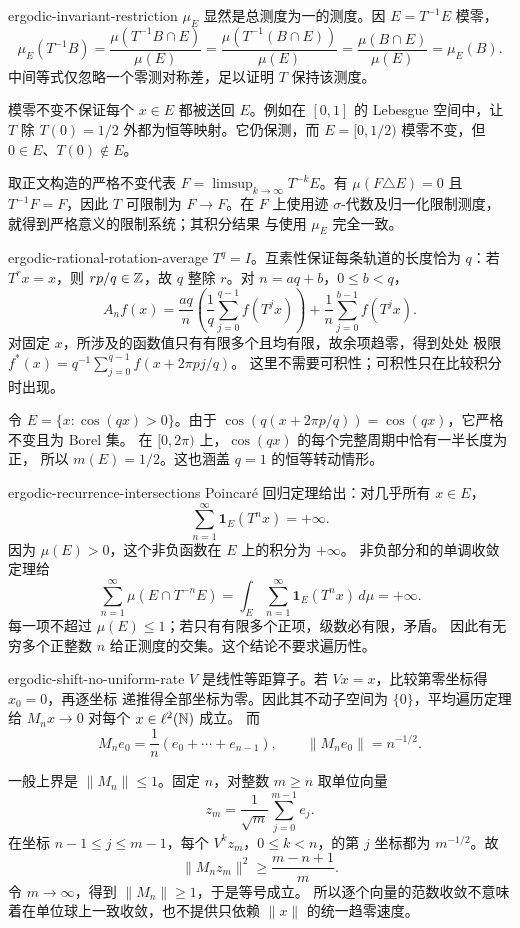 \begin{solution}{ergodic-invariant-restriction}
$\mu_E$ 显然是总测度为一的测度。因 $E=T^{-1}E$ 模零，
\[
 \mu_E(T^{-1}B)
 =\frac{\mu(T^{-1}B\cap E)}{\mu(E)}
 =\frac{\mu(T^{-1}(B\cap E))}{\mu(E)}
 =\frac{\mu(B\cap E)}{\mu(E)}=\mu_E(B).
\]
中间等式仅忽略一个零测对称差，足以证明 $T$ 保持该测度。

模零不变不保证每个 $x\in E$ 都被送回 $E$。例如在 $[0,1]$ 的 Lebesgue
空间中，让 $T$ 除 $T(0)=1/2$ 外都为恒等映射。它仍保测，而
$E=[0,1/2)$ 模零不变，但 $0\in E$、$T(0)\notin E$。

取正文构造的严格不变代表
$F=\limsup_{k\to\infty}T^{-k}E$。有 $\mu(F\triangle E)=0$ 且
$T^{-1}F=F$，因此 $T$ 可限制为 $F\to F$。在 $F$ 上使用迹
$\sigma$-代数及归一化限制测度，就得到严格意义的限制系统；其积分结果
与使用 $\mu_E$ 完全一致。
\end{solution}

\begin{solution}{ergodic-rational-rotation-average}
$T^q=I$。互素性保证每条轨道的长度恰为 $q$：若 $T^rx=x$，则
$rp/q\in\mathbb{Z}$，故 $q$ 整除 $r$。对 $n=aq+b$，$0\le b<q$，
\[
 A_nf(x)=\frac{aq}{n}\left(\frac1q\sum_{j=0}^{q-1}f(T^jx)\right)
          +\frac1n\sum_{j=0}^{b-1}f(T^jx).
\]
对固定 $x$，所涉及的函数值只有有限多个且均有限，故余项趋零，得到处处
极限
$f^*(x)=q^{-1}\sum_{j=0}^{q-1}f(x+2\pi pj/q)$。
这里不需要可积性；可积性只在比较积分时出现。

令 $E=\{x:\cos(qx)>0\}$。由于
$\cos(q(x+2\pi p/q))=\cos(qx)$，它严格不变且为 Borel 集。
在 $[0,2\pi)$ 上，$\cos(qx)$ 的每个完整周期中恰有一半长度为正，
所以 $m(E)=1/2$。这也涵盖 $q=1$ 的恒等转动情形。
\end{solution}

\begin{solution}{ergodic-recurrence-intersections}
Poincar\'e 回归定理给出：对几乎所有 $x\in E$，
\[
 \sum_{n=1}^\infty\mathbf1_E(T^nx)=+\infty.
\]
因为 $\mu(E)>0$，这个非负函数在 $E$ 上的积分为 $+\infty$。
非负部分和的单调收敛定理给
\[
 \sum_{n=1}^\infty\mu(E\cap T^{-n}E)
 =\int_E\sum_{n=1}^\infty\mathbf1_E(T^nx)\,d\mu=+\infty.
\]
每一项不超过 $\mu(E)\le1$；若只有有限多个正项，级数必有限，矛盾。
因此有无穷多个正整数 $n$ 给正测度的交集。这个结论不要求遍历性。
\end{solution}

\begin{solution}{ergodic-shift-no-uniform-rate}
$V$ 是线性等距算子。若 $Vx=x$，比较第零坐标得 $x_0=0$，再逐坐标
递推得全部坐标为零。因此其不动子空间为 $\{0\}$，平均遍历定理给
$M_nx\to0$ 对每个 $x\in\ell^2(\mathbb{N})$ 成立。
而
\[
 M_ne_0=\frac1n(e_0+\cdots+e_{n-1}),\qquad
 \|M_ne_0\|=n^{-1/2}.
\]

一般上界是 $\|M_n\|\le1$。固定 $n$，对整数 $m\ge n$ 取单位向量
\[
 z_m=\frac1{\sqrt m}\sum_{j=0}^{m-1}e_j.
\]
在坐标 $n-1\le j\le m-1$，每个 $V^kz_m$，$0\le k<n$，的第 $j$
坐标都为 $m^{-1/2}$。故
\[
 \|M_nz_m\|^2\ge\frac{m-n+1}{m}.
\]
令 $m\to\infty$，得到 $\|M_n\|\ge1$，于是等号成立。
所以逐个向量的范数收敛不意味着在单位球上一致收敛，也不提供只依赖
$\|x\|$ 的统一趋零速度。
\end{solution}

